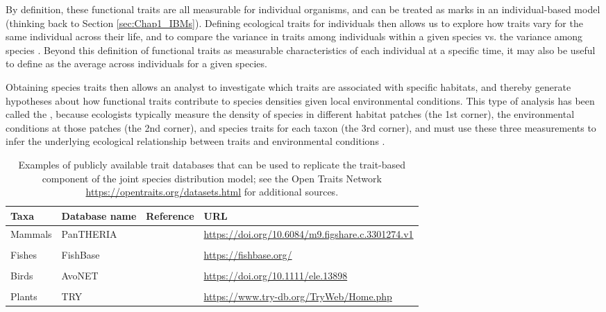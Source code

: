 By definition, these functional traits are all measurable for individual organisms, and can be treated as marks in an individual-based model (thinking back to Section \ref{sec:Chap1_IBMs}).  Defining ecological traits for individuals then allows us to explore how traits vary for the same individual across their life, and to compare the variance in traits among individuals within a given species vs. the variance among species \cite{barnett_realizing_2019}.  Beyond this definition of functional traits as measurable characteristics of each individual at a specific time, it may also be useful to define  as the average across individuals for a given species.  

Obtaining species traits then allows an analyst to investigate which traits are associated with specific habitats, and thereby generate hypotheses about how functional traits contribute to species densities given local environmental conditions.  This type of analysis has been called the , because ecologists typically measure the density of species in different habitat patches (the 1st corner), the environmental conditions at those patches (the 2nd corner), and species traits for each taxon (the 3rd corner), and must use these three measurements to infer the underlying ecological relationship between traits and environmental conditions \cite{legendre_relating_1997}.  

\begin{table}
  \caption[List of public trait databases]{Examples of publicly available trait databases that can be used to replicate the trait-based component of the joint species distribution model;  see the Open Traits Network \url{https://opentraits.org/datasets.html} for additional sources.}
\begin{center}
\begin{tabularx}{\textwidth}{ | X X m{0.5in} m{3in} | } 
  \hline
  Taxa & Database name & Reference & URL \\ 
  \hline

  Mammals & PanTHERIA & \cite{jones_pantheria_2009} & \url{https://doi.org/10.6084/m9.figshare.c.3301274.v1} \\ & & & \\ 
  
  Fishes & FishBase & \cite{froese_fishbase_2000} & \url{https://fishbase.org/} \\ & & & \\ 
  
  Birds & AvoNET & \cite{tobias_avonet_2022} & \url{https://doi.org/10.1111/ele.13898} \\ & & & \\

  Plants & TRY & \cite{kattge_try_2011} & \url{https://www.try-db.org/TryWeb/Home.php} \\

  \hline
\end{tabularx}
  \label{tab:Chap11_trait_databases}
\end{center}
\end{table}

